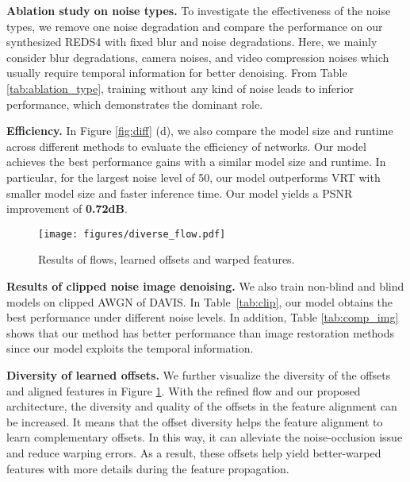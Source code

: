 \documentclass[10pt,twocolumn,letterpaper]{article}
\newlength \g
\begin{document}
\vspace{0.5mm}
\noindent\textbf{Ablation study on noise types.}
To investigate the effectiveness of the noise types, we remove one noise degradation and compare the performance on our synthesized REDS4 with fixed blur and noise degradations. Here, we mainly consider blur degradations, camera noises, and video compression noises which usually require temporal information for better denoising. From Table \ref{tab:ablation_type}, training without any kind of noise leads to inferior performance, which demonstrates the dominant role. 



\noindent\textbf{Efficiency.}
In Figure \ref{fig:diff} (d), we also compare the model size and runtime across different methods to evaluate the efficiency of networks.
Our model achieves the best performance gains with a similar model size and runtime.
In particular, for the largest noise level of 50, our model outperforms VRT \cite{liang2022vrt} with smaller model size and faster inference time. 
Our model yields a PSNR improvement of \textbf{0.72dB}.

\begin{figure}[t]
  \begin{center}
\texttt{[image: figures/diverse\_flow.pdf]}
  \end{center}
  \vspace{-5mm}
  \caption{Results of flows, learned offsets and warped features. }
  \label{fig:diverse_flow}
  \vspace{-5mm}
\end{figure}

\vspace{0.5mm}
\noindent\textbf{Results of clipped noise image denoising.}
We also train non-blind and blind models on clipped AWGN of DAVIS. 
In Table~\ref{tab:clip}, our model obtains the best performance under different noise levels.
In addition, Table \ref{tab:comp_img} shows that our method has better performance than image restoration methods since our
 model exploits the temporal information.

\vspace{0.5mm}
\noindent\textbf{Diversity of learned offsets.}
We further visualize the diversity of the offsets and aligned features in Figure \ref{fig:diverse_flow}.
With the refined flow and our proposed architecture, the diversity and quality of the offsets in the feature alignment can be increased. 
It means that the offset diversity helps the feature alignment to learn complementary offsets. In this way, it can alleviate the noise-occlusion issue and reduce warping errors.
As a result, these offsets help yield better-warped features with more details during the feature propagation.
\end{document}
